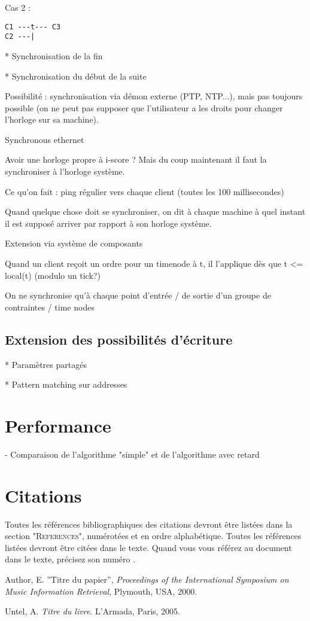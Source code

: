 \documentclass{article}
\begin{document}
Cas 2 : 
\begin{lstlisting}
C1 ---t--- C3
C2 ---|
\end{lstlisting}

* Synchronisation de la fin

* Synchronisation du début de la suite

Possibilité : synchronisation via démon externe (PTP, NTP...), mais pas toujours possible (on ne peut pas supposer que l'utilisateur a les droits pour changer l'horloge sur sa machine).

Synchronous ethernet

Avoir une horloge propre à i-score ? Mais du coup maintenant il faut la synchroniser à l'horloge système. 

Ce qu'on fait : ping régulier vers chaque client (toutes les 100 millisecondes)

Quand quelque chose doit se synchroniser, on dit à chaque machine à quel instant il est supposé arriver par rapport à son horloge système.

Extension via système de composants

Quand un client reçoit un ordre pour un timenode à t, il l'applique dès que t <= local(t) (modulo un tick?)

On ne synchronise qu'à chaque point d'entrée / de sortie d'un groupe de contraintes / time nodes
\subsection{Extension des possibilités d'écriture}
* Paramètres partagés

* Pattern matching sur addresses 

\section{Performance}
- Comparaison de l'algorithme "simple" et de l'algorithme avec retard
\section{Citations}

Toutes les références bibliographiques des citations devront être listées dans la section "\textsc{References}", numérotées et en ordre alphabétique. Toutes les références  listées devront être citées dans le texte. Quand  vous vous référez au document dans le texte, précisez son numéro \cite{Author:00}.

\begin{thebibliography}{2}

 Author, E.
''Titre du papier'',
{\it Proceedings of the International Symposium on Music Information
Retrieval}, Plymouth, USA, 2000.

 Untel, A.
{\it  Titre du livre}.
L'Armada, Paris, 2005.

\end{thebibliography}
\end{document}

